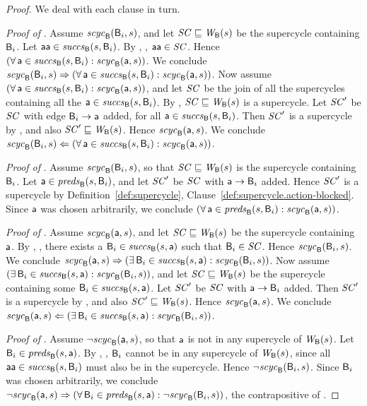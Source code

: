 \begin{proof}
We deal with each clause in turn.


\textit{Proof of }.
%
Assume $\scyc{\B}{s}{\B_i}$, and let $\SC \subg \wfg{\B}{s}$ be the supercycle containing $\B_i$.  Let
$\actp \in \succs{\B}{s}{\B_i}$.  By , ,
$\actp \in \SC$.  Hence $(\fa \act \in \succs{\B}{s}{\B_i} : \scyc{\B}{s}{\act})$.
We conclude
$\scyc{\B}{s}{\B_i} \imp (\fa \act \in \succs{\B}{s}{\B_i} : \scyc{\B}{s}{\act})$.
%
Now assume $(\fa \act \in \succs{\B}{s}{\B_i} : \scyc{\B}{s}{\act})$, and let 
$\SC$ be the join of all the supercycles containing all the $\act \in \succs{\B}{s}{\B_i}$. 
By , $\SC \subg \wfg{\B}{s}$ is a supercycle.
Let $\SC'$ be $\SC$ with edge $\B_i \ar \act$ added, for all 
$\act \in \succs{\B}{s}{\B_i}$.
Then $\SC'$ is a supercycle by 
, and also $\SC' \subg \wfg{\B}{s}$. Hence $\scyc{\B}{s}{\act}$.
We conclude 
$\scyc{\B}{s}{\B_i} \folf (\fa \act \in \succs{\B}{s}{\B_i} : \scyc{\B}{s}{\act})$.




\textit{Proof of }.
%
Assume $\scyc{\B}{s}{\B_i}$, so that $\SC \subg \wfg{\B}{s}$ is the supercycle containing $\B_i$.
Let  $\act \in \preds{\B}{s}{\B_i}$, and let $\SC'$ be $\SC$ with 
$\act \ar \B_i$ added. Hence $\SC'$ is a supercycle 
by Definition~\ref{def:supercycle},
  Clause~\ref{def:supercycle.action-blocked}.
Since $\act$ was chosen arbitrarily, we conclude 
$(\fa \act \in \preds{\B}{s}{\B_i} : \scyc{\B}{s}{\act})$.



\textit{Proof of }.
%
Assume $\scyc{\B}{s}{\act}$, and let $\SC \subg \wfg{\B}{s}$ be the supercycle containing $\act$.  By
, , there exists a
$\B_i \in \succs{\B}{s}{\act}$ such that $\B_i \in \SC$.  Hence $\scyc{\B}{s}{\B_i}$.
We conclude
$\scyc{\B}{s}{\act} \imp (\ex \B_i \in \succs{\B}{s}{\act} : \scyc{\B}{s}{\B_i})$.
%
Now assume $(\ex \B_i \in \succs{\B}{s}{\act} : \scyc{\B}{s}{\B_i})$, and let 
$\SC \subg \wfg{\B}{s}$ be the supercycle containing some $\B_i \in \succs{\B}{s}{\act}$. 
Let $\SC'$ be $\SC$ with $\act \ar \B_i$ added. Then $\SC'$ is a supercycle by 
, and also $\SC' \subg \wfg{\B}{s}$. Hence $\scyc{\B}{s}{\act}$.
We conclude 
$\scyc{\B}{s}{\act} \folf (\ex \B_i \in \succs{\B}{s}{\act} : \scyc{\B}{s}{\B_i})$.


\textit{Proof of }.  
%
Assume $\neg \scyc{\B}{s}{\act}$, so that $\act$ is not in any supercycle of $\wfg{\B}{s}$.
Let $\B_i \in \preds{\B}{s}{\act}$. 
By , , 
$\B_i$ cannot be in any supercycle of $\wfg{\B}{s}$, since all $\actp \in \succs{\B}{s}{\B_i}$ must
also be in the supercycle. Hence $\neg \scyc{\B}{s}{\B_i}$.
Since $\B_i$ was chosen arbitrarily, we conclude
$\neg \scyc{\B}{s}{\act} \imp  (\fa \B_i \in \preds{\B}{s}{\act} : \neg \scyc{\B}{s}{\B_i})$, the
contrapositive of .  
\end{proof}


